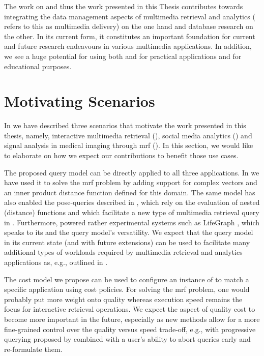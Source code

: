 The work on \cottontail{} and thus the work presented in this Thesis contributes towards integrating the data management aspects of multimedia retrieval and analytics (\cite{Vrochidis:2019Big} refers to this as multimedia delivery) on the one hand and database research on the other. In its current form, it constitutes an important foundation for current and future research endeavours in various multimedia applications. In addition, we see a huge potential for using both \vitrivr{} and \cottontail{} for practical applications and for educational purposes.

\section{Motivating Scenarios}

In  we have described three scenarios that motivate the work presented in this thesis, namely, interactive multimedia retrieval (), social media analytics () and signal analysis in medical imaging through \acrshort{mrf} (). In this section, we would like to elaborate on how we expect our contributions to benefit those use cases.

The proposed query model can be directly applied to all three applications. In \cite{Huerbin:2020Retrieval,Zihlmann:2021Magnetic} we have used it to solve the \acrshort{mrf} problem by adding support for complex vectors and an inner product distance function defined for this domain. The same model has also enabled the pose-queries described in \cite{Heller:2022Multi}, which rely on the evaluation of nested (distance) functions and which facilitate a new type of multimedia retrieval query in \vitrivr. Furthermore, \cottontail{} powered rather experimental systems such as LifeGraph \cite{Rossetto:2021Exploring}, which speaks to its and the query model's versatility. We expect that the query model in its current state (and with future extensions) can be used to facilitate many additional types of workloads required by multimedia retrieval and analytics applications as, e.g., outlined in \cite{Seebacher:2017Visual}.

The cost model we propose can be used to configure an instance of \cottontail{} to match a specific application using cost policies. For solving the \acrshort{mrf} problem, one would probably put more weight onto quality whereas execution speed remains the focus for interactive retrieval operations. We expect the aspect of quality cost to become more important in the future, especially as new methods allow for a more fine-grained control over the quality versus speed trade-off, e.g., with progressive querying proposed by \cite{Giangreco:2018Database} combined with a user's ability to abort queries early and re-formulate them.


